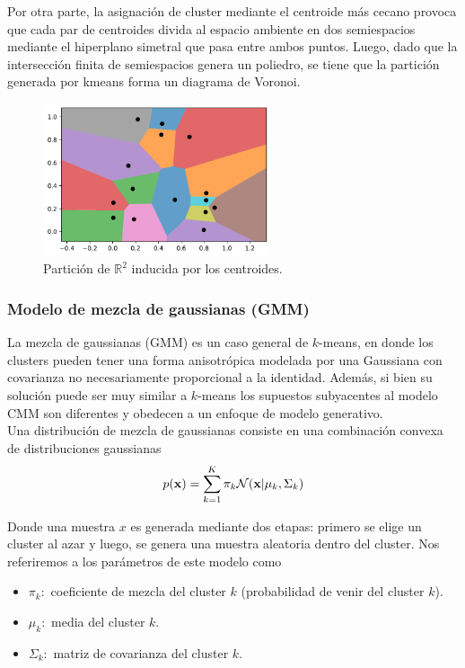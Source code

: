 Por otra parte, la asignación de cluster mediante el centroide más cecano provoca que cada par de centroides divida al espacio ambiente en dos semiespacios mediante el hiperplano simetral que pasa entre ambos puntos. Luego, dado que la intersección finita de semiespacios genera un poliedro, se tiene que la partición generada por kmeans forma un diagrama de Voronoi.

\begin{figure}[h]
  \centering
  \includegraphics[width=0.6\textwidth]{img/cap6_voronoi}
  \caption{Partición de $\mathbb{R}^2$ inducida por los centroides.}
  \label{fig:kmeans}
\end{figure}


\subsubsection{Modelo de mezcla de gaussianas (GMM)}

La mezcla de gaussianas (GMM) es un caso general de $k$-means, en donde los clusters pueden tener una forma anisotrópica modelada por una Gaussiana con covarianza no necesariamente proporcional a la identidad. Además, si bien su solución puede ser muy similar a $k$-means los supuestos subyacentes al modelo CMM son diferentes y obedecen a un enfoque de modelo generativo. \\


Una distribución de mezcla de gaussianas consiste en una combinación convexa de distribuciones gaussianas
\begin{equation}
	p(\mathbf{x}) = \sum_{k=1}^K \pi_k \mathcal{N}(\mathbf{x}| \mu_k,\Sigma_k)
\end{equation}

Donde una muestra $x$ es generada mediante dos etapas: primero se elige un cluster al azar y luego, se genera una muestra aleatoria dentro del cluster. Nos referiremos a los parámetros de este modelo como 

\begin{itemize}
	\item $\pi_k:$ coeficiente de mezcla del cluster  $k$ (probabilidad de venir del cluster $k$).
	\item $\mu_k:$ media del cluster  $k$.
	\item $\Sigma_k:$ matriz de covarianza del cluster  $k$.
\end{itemize}

